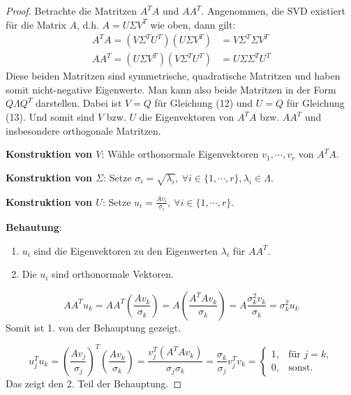 \documentclass{article}
\theoremstyle{plain}
\theoremstyle{definition}
\begin{document}
\begin{proof} \cite[S. 56f., 58f.]{strang2019linear}
    Betrachte die Matritzen $A^TA$ und $AA^T$. Angenommen, die SVD existiert für die Matrix $A$, d.h. $A = U \Sigma V^T$ wie oben, dann gilt:
    \begin{align}
        A^TA = (V \Sigma^T U^T) (U \Sigma V^T) &= V \Sigma^T \Sigma V^T \\
        AA^T = (U \Sigma V^T) (V \Sigma^T U^T) &= U \Sigma \Sigma^T U^T
    \end{align}
    Diese beiden Matritzen sind symmetrische, quadratische Matritzen und haben somit
    nicht-negative Eigenwerte. Man kann also beide Matritzen in der Form $Q \Lambda Q^T$ darstellen.
    Dabei ist $V = Q$ für Gleichung (12) und $U = Q$ für Gleichung (13). Und somit sind $V$ bzw. $U$ die Eigenvektoren
    von $A^TA$ bzw. $AA^T$ und insbesondere orthogonale Matritzen.

    \textbf{Konstruktion von $V$}: Wähle orthonormale Eigenvektoren $v_1, \cdots, v_r$ von $A^TA$.

    \textbf{Konstruktion von $\Sigma$}: Setze $\sigma_i = \sqrt{\lambda_i}, \: \forall i \in \{1, \cdots, r\}, \lambda_i \in \Lambda$.

    \textbf{Konstruktion von $U$}: Setze $u_i = \frac{Av_i}{\sigma_i}, \: \forall i \in \{1, \cdots, r\}$.
    
    \textbf{Behautung}: 
    \begin{enumerate}
        \item $u_i$ sind die Eigenvektoren zu den Eigenwerten $\lambda_i$ für $AA^T$.
        \item Die $u_i$ sind orthonormale Vektoren.
    \end{enumerate}
    \begin{equation*}
        AA^Tu_k = AA^T\left(\frac{Av_k}{\sigma_k}\right) = A\left(\frac{A^TAv_k}{\sigma_k}\right) = A\frac{\sigma_k^2v_k}{\sigma_k} = \sigma_k^2u_k
    \end{equation*}
    Somit ist 1. von der Behauptung gezeigt.

    \begin{equation*}
        u_j^Tu_k = \left(\frac{Av_j}{\sigma_j}\right)^T\left(\frac{Av_k}{\sigma_k}\right) = \frac{v_j^T(A^TAv_k)}{\sigma_j\sigma_k} = \frac{\sigma_k}{\sigma_j}v_j^Tv_k = \begin{cases}
            1, &\text{für } j = k,\\
            0, &\text{sonst}.
        \end{cases}
    \end{equation*}
    Das zeigt den 2. Teil der Behauptung.


\end{proof}
\end{document}
